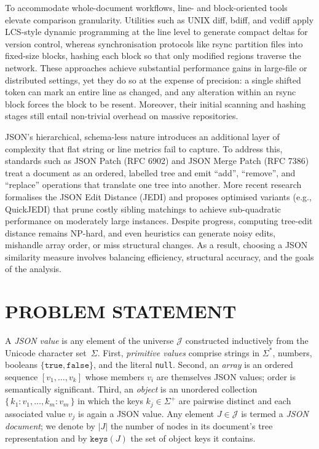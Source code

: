 \documentclass[sigconf]{acmart}
\begin{document}
To accommodate whole-document workflows, line- and block-oriented tools elevate comparison granularity. Utilities such as UNIX diff, bdiff, and vcdiff apply LCS-style dynamic programming at the line level to generate compact deltas for version control, whereas synchronisation protocols like rsync partition files into fixed-size blocks, hashing each block so that only modified regions traverse the network. These approaches achieve substantial performance gains in large-file or distributed settings, yet they do so at the expense of precision: a single shifted token can mark an entire line as changed, and any alteration within an rsync block forces the block to be resent. Moreover, their initial scanning and hashing stages still entail non-trivial overhead on massive repositories.

JSON’s hierarchical, schema-less nature introduces an additional layer of complexity that flat string or line metrics fail to capture. To address this, standards such as JSON Patch (RFC 6902) and JSON Merge Patch (RFC 7386) treat a document as an ordered, labelled tree and emit “add”, “remove”, and “replace” operations that translate one tree into another. More recent research formalises the JSON Edit Distance (JEDI) and proposes optimised variants (e.g., QuickJEDI) that prune costly sibling matchings to achieve sub-quadratic performance on moderately large instances. Despite progress, computing tree-edit distance remains NP-hard, and even heuristics can generate noisy edits, mishandle array order, or miss structural changes. As a result, choosing a JSON similarity measure involves balancing efficiency, structural accuracy, and the goals of the analysis.

\section{PROBLEM STATEMENT}
\label{sec:problem}

A \emph{JSON value} is any element of the universe $\mathcal{J}$ constructed inductively from the Unicode character set~$\Sigma$.  
First, \emph{primitive values} comprise strings in $\Sigma^{*}$, numbers, booleans $\{\texttt{true},\texttt{false}\}$, and the literal \texttt{null}.  
Second, an \emph{array} is an ordered sequence $[v_{1},\dots,v_{k}]$ whose members $v_{i}$ are themselves JSON values; order is semantically significant.  
Third, an \emph{object} is an unordered collection $\{\,k_{1}\!:\!v_{1},\dots,k_{m}\!:\!v_{m}\,\}$ in which the keys $k_{j}\in\Sigma^{+}$ are pairwise distinct and each associated value $v_{j}$ is again a JSON value.  
Any element $J\in\mathcal{J}$ is termed a \emph{JSON document}; we denote by $\lvert J\rvert$ the number of nodes in its document’s tree representation and by $\texttt{keys}(J)$ the set of object keys it contains.
\end{document}
